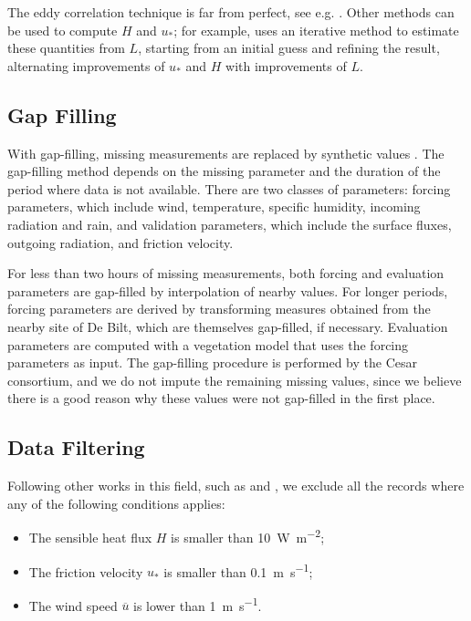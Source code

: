 \documentclass[12pt]{book}
\begin{document}
The eddy correlation technique is far from perfect, see e.g. \citep{microhandbook, ed_co2}. Other methods can be used to compute $H$ and $u_*$; for example, \cite{cabauw_abl} uses an iterative method to estimate these quantities from $L$, starting from an initial guess and refining the result, alternating improvements of $u_*$ and $H$ with improvements of $L$.

\subsection{Gap Filling}
\label{sec:gap_filling}
With gap-filling, missing measurements are replaced by synthetic values \citep{cabauw_gapfilling}. The gap-filling method depends on the missing parameter and the duration of the period where data is not available. There are two classes of parameters: forcing parameters, which include wind, temperature, specific humidity, incoming radiation and rain, and validation parameters, which include the surface fluxes, outgoing radiation, and friction velocity.

For less than two hours of missing measurements, both forcing and evaluation parameters are gap-filled by interpolation of nearby values. For longer periods, forcing parameters are derived by transforming measures obtained from the nearby site of De Bilt, which are themselves gap-filled, if necessary. Evaluation parameters are computed with a vegetation model that uses the forcing parameters as input. The gap-filling procedure is performed by the Cesar consortium, and we do not impute the remaining missing values, since we believe there is a good reason why these values were not gap-filled in the first place.

\subsection{Data Filtering}
\label{sec:data_filter}
Following other works in this field, such as \cite{boulder} and \cite{hogstrom88}, we exclude all the records where any of the following conditions applies:

\begin{itemize}
\item The sensible heat flux $H$ is smaller than \SI{10}{\watt\per\square\meter};
\item The friction velocity $u_*$ is smaller than \SI{0.1}{\meter\per\second};
\item The wind speed $\overline{u}$ is lower than \SI{1}{\meter\per\second}.
\end{itemize}
\end{document}
